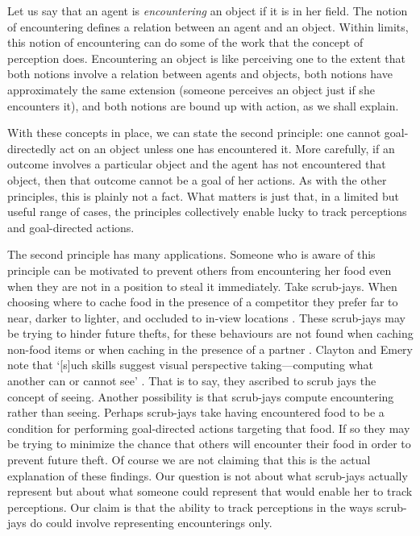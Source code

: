 \documentclass[12pt,\papersize]{extarticle}
\begin{document}
Let us say that an agent is \textit{encountering} an object if it is in her field.  The notion of encountering defines a relation between an agent and an object.  Within limits, this notion of encountering can do some of the work that the concept of perception does.  Encountering an object is like perceiving one to the extent that both notions involve a relation between agents and objects, both notions have approximately the same extension (someone perceives an object just if she encounters it), and both notions are bound up with action, as we shall explain.  

With these concepts in place, we can state the second principle: 
one cannot goal-directedly act on an object unless one has encountered it.  
More carefully,
if an outcome involves a particular object
and the agent has not encountered that object,
then that outcome cannot be a goal of her actions.
As with the other principles, this is plainly not a fact.
What matters is just that, in a limited but useful range of cases, the principles collectively enable lucky to track perceptions and goal-directed actions.

The second principle has many applications.  Someone who is aware of this principle can be motivated to prevent others from encountering her food even when they are not in a position to steal it immediately.  Take scrub-jays.  When choosing where to cache food in the presence of a competitor they prefer far to near, darker to lighter, and occluded to in-view locations \citep[]{en_1451, en_1452}.  These scrub-jays may be trying to hinder future thefts, for these behaviours are not found when caching non-food items \citep[]{en_1419} or when caching in the presence of a partner \citep[][p.\ 514]{Clayton:2007fh, Emery:2007ze}.  Clayton and Emery note that `[s]uch skills suggest visual perspective taking—computing what another can or cannot see' \citep[]{en_1451}. That is to say, they ascribed to scrub jays the concept of seeing.  Another possibility is that scrub-jays compute encountering rather than seeing.  Perhaps scrub-jays take having encountered food to be a condition for performing goal-directed actions targeting that food.  If so they may be trying to minimize the chance that others will encounter their food in order to prevent future theft.  
Of course we  are not claiming that this is the actual explanation of these findings.  
Our question is not about what scrub-jays actually represent but about what someone could represent that would enable her to track perceptions.
Our claim is that the ability to track perceptions in the ways scrub-jays do could involve representing encounterings only.
\end{document}
